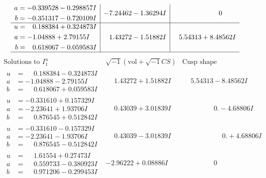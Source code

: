 \documentclass[1p]{elsarticle_modified}
\theoremstyle{definition}
\newcommand{\I}{\sqrt{-1}}
\begin{document}
$$\begin{array}{c|c|c}
\begin{aligned}
a &= -0.339528 - 0.298857 I \\
b &= -0.351317 - 0.720109 I\end{aligned}
 & -7.24462 - 1.36294 I & \phantom{-0.000000 } 0 \\ \hline\begin{aligned}
u &= \phantom{-}0.188384 + 0.324873 I \\
a &= -1.04888 + 2.79155 I \\
b &= \phantom{-}0.618067 - 0.059583 I\end{aligned}
 & \phantom{-}1.43272 - 1.51882 I & \phantom{-}5.54313 + 8.48562 I\\
 \hline 
 \end{array}$$\newpage$$\begin{array}{c|c|c}  
\text{Solutions to }I^u_{1}& \I (\text{vol} + \sqrt{-1}CS) & \text{Cusp shape}\\
 \hline 
\begin{aligned}
u &= \phantom{-}0.188384 - 0.324873 I \\
a &= -1.04888 - 2.79155 I \\
b &= \phantom{-}0.618067 + 0.059583 I\end{aligned}
 & \phantom{-}1.43272 + 1.51882 I & \phantom{-}5.54313 - 8.48562 I \\ \hline\begin{aligned}
u &= -0.331610 + 0.157329 I \\
a &= -2.23641 + 1.93706 I \\
b &= \phantom{-}0.876545 + 0.512842 I\end{aligned}
 & \phantom{-}0.43039 + 3.01839 I & \phantom{-0.000000 } 0. - 4.68806 I \\ \hline\begin{aligned}
u &= -0.331610 - 0.157329 I \\
a &= -2.23641 - 1.93706 I \\
b &= \phantom{-}0.876545 - 0.512842 I\end{aligned}
 & \phantom{-}0.43039 - 3.01839 I & \phantom{-0.000000 -}0. + 4.68806 I \\ \hline\begin{aligned}
u &= \phantom{-}1.61554 + 0.27473 I \\
a &= \phantom{-}0.559733 - 0.380923 I \\
b &= \phantom{-}0.971206 - 0.299453 I\end{aligned}
 & -2.96222 + 0.08886 I & \phantom{-0.000000 } 0 \\ \hline\begin{aligned}

\end{aligned}
\end{array}$$
\end{document}
